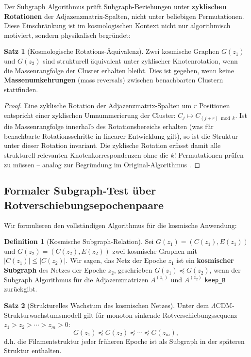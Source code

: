 ﻿\documentclass[a4paper,12pt]{article}
\theoremstyle{definition}
\newtheorem{definition}{Definition}[section]
\newtheorem{satz}{Satz}[section]
\theoremstyle{remark}
\begin{document}
Der Subgraph Algorithmus prüft Subgraph-Beziehungen unter \textbf{zyklischen
Rotationen} der Adjazenzmatrix-Spalten, nicht unter beliebigen Permutationen.
Diese Einschränkung ist im kosmologischen Kontext nicht nur algorithmisch
motiviert, sondern physikalisch begründet:

\begin{satz}[Kosmologische Rotations-Äquivalenz]
  \label{satz:rotation_kosmo}
  Zwei kosmische Graphen $G(z_1)$ und $G(z_2)$ sind strukturell äquivalent
  unter zyklischer Knotenrotation, wenn die Massenrangfolge der Cluster
  erhalten bleibt. Dies ist gegeben, wenn keine
  \textbf{Massenumkehrungen} (mass reversals) zwischen benachbarten
  Clustern stattfinden.
\end{satz}

\begin{proof}
  Eine zyklische Rotation der Adjazenzmatrix-Spalten um $r$ Positionen
  entspricht einer zyklischen Umnummerierung der Cluster:
  $C_j \mapsto C_{(j+r) \bmod k}$. Ist die Massenrangfolge innerhalb
  des Rotationsbereichs erhalten (was für benachbarte Rotationsschritte
  in linearer Entwicklung gilt), so ist die Struktur unter dieser Rotation
  invariant. Die zyklische Rotation erfasst damit alle strukturell
  relevanten Knotenkorrespondenzen ohne die $k!$ Permutationen prüfen
  zu müssen -- analog zur Begründung im Original-Algorithmus \cite{eppsubgraph2026}.
\end{proof}

\subsection{Formaler Subgraph-Test über Rotverschiebungsepochenpaare}

Wir formulieren den vollständigen Algorithmus für die kosmische Anwendung:

\begin{definition}[Kosmische Subgraph-Relation]
  Sei $G(z_1) = (C(z_1), E(z_1))$ und $G(z_2) = (C(z_2), E(z_2))$
  zwei kosmische Graphen mit $|C(z_1)| \leq |C(z_2)|$. Wir sagen,
  das Netz der Epoche $z_1$ ist ein \textbf{kosmischer Subgraph}
  des Netzes der Epoche $z_2$, geschrieben $G(z_1) \preceq G(z_2)$,
  wenn der Subgraph Algorithmus \cite{eppsubgraph2026} für die
  Adjazenzmatrizen $A^{(z_1)}$ und $A^{(z_2)}$ \texttt{keep\_B} zurückgibt.
\end{definition}

\begin{satz}[Strukturelles Wachstum des kosmischen Netzes]
  \label{satz:wachstum}
  Unter dem $\Lambda$CDM-Struktur\-wachstumsmodell gilt für monoton sinkende
  Rotverschiebungssequenz $z_1 > z_2 > \cdots > z_m > 0$:
  \begin{equation}
    G(z_1) \preceq G(z_2) \preceq \cdots \preceq G(z_m),
  \end{equation}
  d.h. die Filamentstruktur jeder früheren Epoche ist als Subgraph in der
  späteren Struktur enthalten.
\end{satz}
\end{document}
